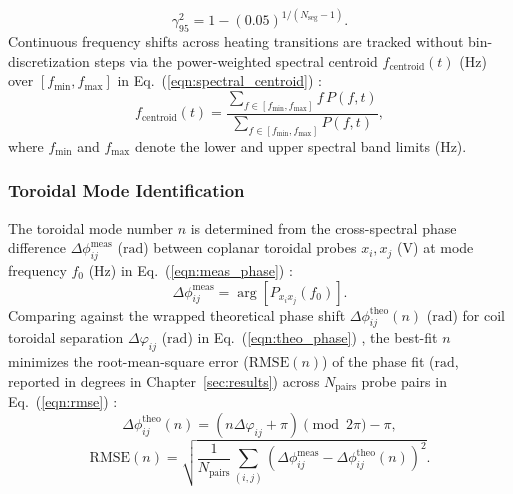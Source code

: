\begin{equation}
\label{eqn:noise_floor}
\gamma_{95}^2 = 1 - (0.05)^{1/(N_{\mathrm{seg}} - 1)}.
\end{equation}
Continuous frequency shifts across heating transitions are tracked without bin-discretization steps via the power-weighted spectral centroid $f_{\mathrm{centroid}}(t)$ ($\mathrm{Hz}$) over $[f_{\min}, f_{\max}]$ in Eq.~(\ref{eqn:spectral_centroid}) \cite{boashash2015time}:
\begin{equation}
\label{eqn:spectral_centroid}
f_{\mathrm{centroid}}(t) = \frac{\sum_{f \in [f_{\min}, f_{\max}]} f \, P(f, t)}{\sum_{f \in [f_{\min}, f_{\max}]} P(f, t)},
\end{equation}
\noindent where $f_{\min}$ and $f_{\max}$ denote the lower and upper spectral band limits ($\mathrm{Hz}$).

\subsubsection{Toroidal Mode Identification}
The toroidal mode number $n$ is determined from the cross-spectral phase difference $\Delta\phi_{ij}^{\mathrm{meas}}$ ($\mathrm{rad}$) between coplanar toroidal probes $x_i, x_j$ ($\mathrm{V}$) at mode frequency $f_0$ ($\mathrm{Hz}$) in Eq.~(\ref{eqn:meas_phase}) \cite{bendat2010random, Smith1971}:
\begin{equation}
\label{eqn:meas_phase}
\Delta\phi_{ij}^{\mathrm{meas}} = \arg\left[P_{x_i x_j}(f_0)\right].
\end{equation}
Comparing against the wrapped theoretical phase shift $\Delta\phi_{ij}^{\mathrm{theo}}(n)$ ($\mathrm{rad}$) for coil toroidal separation $\Delta\varphi_{ij}$ ($\mathrm{rad}$) in Eq.~(\ref{eqn:theo_phase}) \cite{strait2006, Seo2019TheEO}, the best-fit $n$ minimizes the root-mean-square error ($\mathrm{RMSE}(n)$) of the phase fit ($\mathrm{rad}$, reported in degrees in Chapter~\ref{sec:results}) across $N_{\mathrm{pairs}}$ probe pairs in Eq.~(\ref{eqn:rmse}) \cite{schittenhelm1997analysis}:
\begin{equation}
\label{eqn:theo_phase}
\Delta\phi_{ij}^{\mathrm{theo}}(n) = (n \Delta\varphi_{ij} + \pi) \pmod{2\pi} - \pi,
\end{equation}
\begin{equation}
\label{eqn:rmse}
\mathrm{RMSE}(n) = \sqrt{\frac{1}{N_{\mathrm{pairs}}} \sum_{(i,j)} \left(\Delta\phi_{ij}^{\mathrm{meas}} - \Delta\phi_{ij}^{\mathrm{theo}}(n)\right)^2}.
\end{equation}

